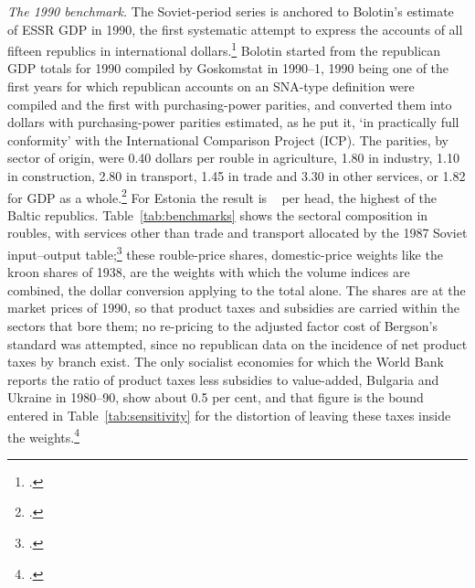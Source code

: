\textit{The 1990 benchmark.} The Soviet-period series is anchored to Bolotin's estimate of ESSR GDP in 1990, the first systematic attempt to express the accounts of all fifteen republics in international dollars.\footnote{\autocite[181--92]{bolotin1992}.} Bolotin started from the republican GDP totals for 1990 compiled by Goskomstat in 1990--1, 1990 being one of the first years for which republican accounts on an SNA-type definition were compiled and the first with purchasing-power parities, and converted them into dollars with purchasing-power parities estimated, as he put it, `in practically full conformity' with the International Comparison Project (ICP). The parities, by sector of origin, were 0.40 dollars per rouble in agriculture, 1.80 in industry, 1.10 in construction, 2.80 in transport, 1.45 in trade and 3.30 in other services, or 1.82 for GDP as a whole.\footnote{\autocite[181, 184]{bolotin1992}.} For Estonia the result is ~\intlnineteen{} per head, the highest of the Baltic republics. Table~\ref{tab:benchmarks} shows the sectoral composition in roubles, with services other than trade and transport allocated by the 1987 Soviet input--output table;\footnote{\autocite{wbinputoutput1987}.} these rouble-price shares, domestic-price weights like the kroon shares of 1938, are the weights with which the volume indices are combined, the dollar conversion applying to the total alone. The shares are at the market prices of 1990, so that product taxes and subsidies are carried within the sectors that bore them; no re-pricing to the adjusted factor cost of Bergson's standard was attempted, since no republican data on the incidence of net product taxes by branch exist. The only socialist economies for which the World Bank reports the ratio of product taxes less subsidies to value-added, Bulgaria and Ukraine in 1980--90, show about 0.5 per cent, and that figure is the bound entered in Table~\ref{tab:sensitivity} for the distortion of leaving these taxes inside the weights.\footnote{\autocite{wdi2024}.}

